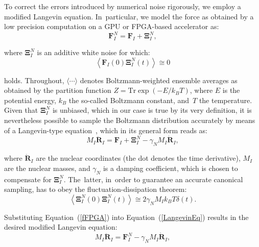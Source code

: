\documentclass[computation,article,accept,moreauthors,pdftex]{Definitions/mdpi}
\begin{document}
To correct the errors introduced by numerical noise rigorously, we employ a modified Langevin equation. In~particular, we model the force as obtained by a low precision computation on a GPU or FPGA-based accelerator as:
\begin{equation} \label{fFPGA}
\textbf{F}_{I}^{N} = \textbf{F}_{I} + \mathbf{\Xi }_{I}^{N},
\end{equation}

\noindent where $\mathbf{\Xi }_{I}^{N}$ is an additive white noise for which:
\begin{equation} \label{CrossCorr}
 \left \langle \textbf{F}_{I}\left ( 0 \right ) \mathbf{\Xi } _{I}^{N}\left ( t \right )\right \rangle \cong 0
\end{equation}

\noindent holds. Throughout, $\langle \cdots \rangle$ denotes Boltzmann-weighted ensemble averages as obtained by the partition function $Z=\text{Tr} \exp(-E/k_B T)$, where $E$ is the potential energy, $k_B$ the so-called Boltzmann constant, and~$T$ the temperature. Given that $\mathbf{\Xi }_{I}^{N}$ is unbiased, which in our case is true by its very definition, it is nevertheless possible to sample the Boltzmann distribution accurately by means of a Langevin-type equation~\cite{Krajewski,Richters,Karhan}, which in its general form reads as:
\begin{equation} \label{LangevinEq}
M_{I}\ddot{\textbf{R}}_{I}=\textbf{F}_{I}+\mathbf{\Xi }_{I}^{N}-\gamma _{N}M_{I}\dot{\textbf{R}}_{I},
\end{equation}

\noindent where $\dot{\textbf{R}}_{I}$ are the nuclear coordinates (the dot denotes the time derivative), $M_I$ are the nuclear masses, and $\gamma _{N}$ is a damping coefficient,
which is chosen to compensate for \(\mathbf{\Xi }_{I}^{N}\). The~latter, in~order to guarantee an accurate canonical sampling, has to obey
the fluctuation-dissipation theorem:
\begin{equation}
\left \langle \mathbf{\Xi }_{I}^{N}\left ( 0 \right ) \mathbf{\Xi }_{I}^{N}\left ( t \right ) \right \rangle \cong 2 \gamma_{N} M_I k_{B} T \delta \left ( t \right ).
\label{FDT}
\end{equation}

\noindent Substituting Equation~(\ref{fFPGA}) into Equation~(\ref{LangevinEq}) results in the desired modified Langevin equation:
\begin{equation} \label{modLangevin}
M_{I}\ddot{\textbf{R}}_{I} = \textbf{F}_{I}^{N}-\gamma _{N}M_{I}\dot{\textbf{R}}_{I},
\end{equation}
\end{document}
